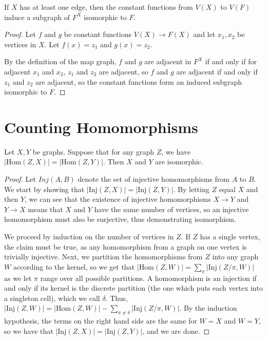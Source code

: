 \begin{lemma}
	If $X$ has at least one edge, then the constant functions from $V(X)$ to $V(F)$ induce a subgraph of $F^X$ isomorphic to $F$.
\end{lemma}
\begin{proof}
	Let $f$ and $g$ be constant functions $V(X)\rightarrow F(X)$ and let $x_1,x_2$ be vertices in $X$.  Let $f(x)=z_1$ and $g(x)=z_2$.
	
	By the definition of the map graph, $f$ and $g$ are adjacent in $F^X$ if and only if for adjacent $x_1$ and $x_2$, $z_1$ and $z_2$ are adjacent, so $f$ and $g$ are adjacent if and only if $z_1$ and $z_2$ are adjacent, so the constant functions form an induced subgraph isomorphic to $F$.
\end{proof}


\section*{Counting Homomorphisms}

\begin{lemma}
	Let $X,Y$ be graphs.  Suppose that for any graph $Z$, we have $|\text{Hom}(Z,X)|=|\text{Hom}(Z,Y)|$.  Then $X$ and $Y$ are isomorphic.
\end{lemma}

\begin{proof}
	Let $Inj(A,B)$ denote the set of injective homomorphisms from $A$ to $B$.  We start by showing that $|\text{Inj}(Z,X)|=|\text{Inj}(Z,Y)|$.  By letting $Z$ equal $X$ and then $Y$, we can see that the existence of injective homomorphisms $X\rightarrow Y$ and $Y\rightarrow X$ means that $X$ and $Y$ have the same number of vertices, so an injective homomorphism must also be surjective, thus demonstrating isomorphism.
	
	We proceed by induction on the number of vertices in $Z$.  If $Z$ has a single vertex, the claim must be true, as any homomorphism from a graph on one vertex is trivially injective.  Next, we partition the homomorphisms from $Z$ into any graph $W$ according to the kernel, so we get that $|\text{Hom}(Z,W)|=\sum\limits_\pi |\text{Inj}(Z/\pi,W)|$ as we let $\pi$ range over all possible partitions.  A homomorphism is an injection if and only if its kernel is the discrete partition (the one which puts each vertex into a singleton cell), which we call $\delta$.  Thus, $|\text{Inj}(Z,W)|=|\text{Hom}(Z,W)|-\sum\limits_{\pi\neq \delta}|\text{Inj}(Z/\pi,W)|$.  By the induction hypothesis, the terms on the right hand side are the same for $W=X$ and $W=Y$, so we have that $|\text{Inj}(Z,X)|=|\text{Inj}(Z,Y)|$, and we are done.
\end{proof}

